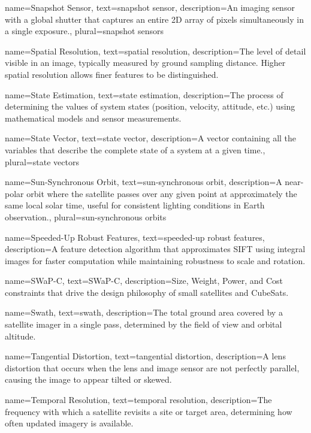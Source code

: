 {
	name=Snapshot Sensor,
	text=snapshot sensor,
	description={An imaging sensor with a global shutter that captures an entire 2D array of pixels simultaneously in a single exposure.},
	plural=snapshot sensors
}

{
	name=Spatial Resolution,
	text=spatial resolution,
	description={The level of detail visible in an image, typically measured by ground sampling distance. Higher spatial resolution allows finer features to be distinguished.}
}

{
	name=State Estimation,
	text=state estimation,
	description={The process of determining the values of system states (position, velocity, attitude, etc.) using mathematical models and sensor measurements.}
}

{
	name=State Vector,
	text=state vector,
	description={A vector containing all the variables that describe the complete state of a system at a given time.},
	plural=state vectors
}

{
	name=Sun-Synchronous Orbit,
	text=sun-synchronous orbit,
	description={A near-polar orbit where the satellite passes over any given point at approximately the same local solar time, useful for consistent lighting conditions in Earth observation.},
	plural=sun-synchronous orbits
}

{
	name=Speeded-Up Robust Features,
	text=speeded-up robust features,
	description={A feature detection algorithm that approximates SIFT using integral images for faster computation while maintaining robustness to scale and rotation.}
}

{
	name=SWaP-C,
	text=SWaP-C,
	description={Size, Weight, Power, and Cost constraints that drive the design philosophy of small satellites and CubeSats.}
}

{
	name=Swath,
	text=swath,
	description={The total ground area covered by a satellite imager in a single pass, determined by the field of view and orbital altitude.}
}

{
	name=Tangential Distortion,
	text=tangential distortion,
	description={A lens distortion that occurs when the lens and image sensor are not perfectly parallel, causing the image to appear tilted or skewed.}
}

{
	name=Temporal Resolution,
	text=temporal resolution,
	description={The frequency with which a satellite revisits a site or target area, determining how often updated imagery is available.}
}


